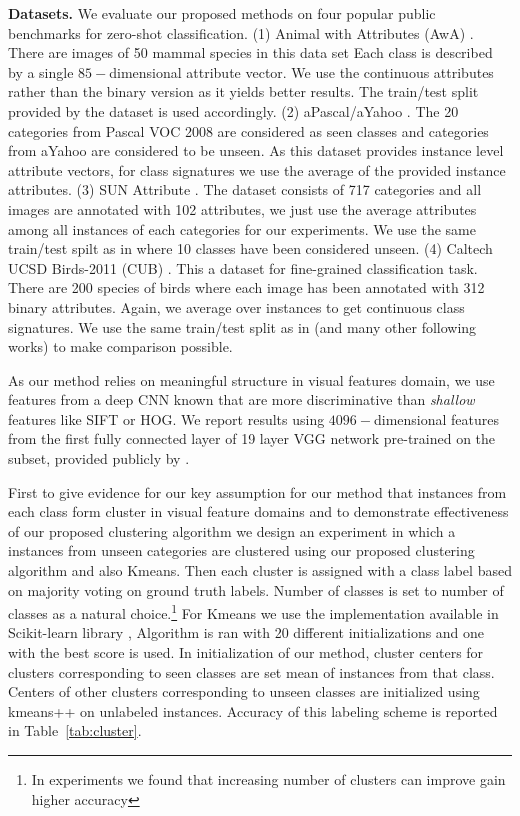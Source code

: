 \documentclass[10pt,twocolumn,letterpaper]{article}
\begin{document}
\textbf{Datasets.}
We evaluate our proposed methods on four popular public benchmarks for zero-shot classification.
(1) Animal with Attributes (AwA) \cite{lampert09}. There are images of 50 mammal species in this data set
Each class is described by a single $85-$dimensional attribute vector. We use the continuous attributes rather than
the binary version as it yields better results. The train/test split provided by the dataset is used accordingly.
(2) aPascal/aYahoo \cite{farhadi09}. The 20 categories from Pascal VOC 2008 \cite{pascal} are considered as seen classes and
categories from aYahoo are considered to be unseen. As this dataset provides instance level attribute vectors,
for class signatures we use the average of the provided instance attributes.
(3) SUN Attribute \cite{sun}. The dataset consists of 717 categories and all images are annotated with 102 attributes, we just
use the average attributes among all instances of each categories for our experiments. We use the same train/test spilt
as in \cite{jayaraman14} where 10 classes have been considered unseen.
(4) Caltech UCSD Birds-2011 (CUB) \cite{cub}. This a dataset for fine-grained classification task. There are 200 species of
birds where each image has been annotated with 312 binary attributes. Again, we average over instances to get continuous class signatures.
We use the same train/test split as in \cite{akata13} (and many other following works) to make comparison possible.


As our method relies on meaningful structure in visual features domain, we use features from a deep CNN known that are
 more discriminative than \textit{shallow} features like SIFT or HOG. We report results using
  $4096-$dimensional features from the first fully connected layer of 19 layer VGG network \cite{vgg}
pre-trained on the subset, provided publicly by \cite{sse}.

First to give evidence for  our key assumption for our method that instances from each class form cluster in visual feature domains
and to demonstrate effectiveness of our proposed clustering algorithm we design an
experiment in which a instances from unseen categories are clustered using our proposed clustering algorithm and also Kmeans. Then
 each cluster is assigned with a class label based on majority voting on ground truth labels. Number of classes
 is set to number of classes as a natural choice.\footnote{In experiments we found that increasing number of clusters can improve gain higher accuracy}
For Kmeans we use the implementation available in Scikit-learn library \cite{scikit-learn}, Algorithm is ran with 20 different initializations
and one with the best score is used.
In initialization of our method, cluster centers for clusters corresponding to seen classes are set  mean of instances from that class. Centers of other
clusters corresponding to unseen classes are initialized using kmeans++ \cite{kmeanspp} on unlabeled instances.
Accuracy of this labeling scheme is reported in Table~\ref{tab:cluster}.
\end{document}
